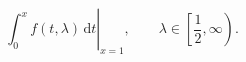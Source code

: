 \[  \left.
\int_0^x f(t,\lambda) \,\mathrm{d}t
    \right|_{x=1}, \qquad
\lambda \in
  \left[\frac12,\infty\right).  \]
